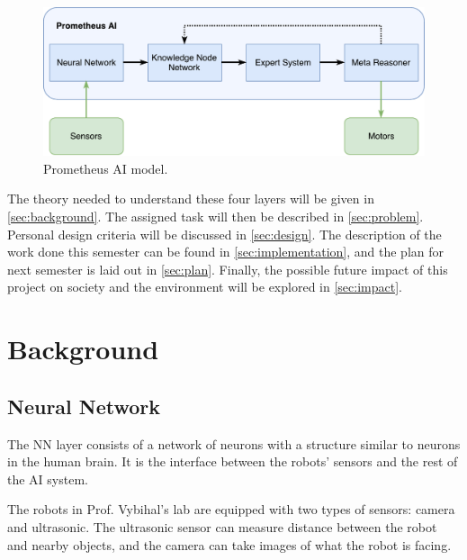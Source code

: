 \documentclass[titlepage,11pt]{article}
\begin{document}
\begin{figure}[!htb]
	\includegraphics[width=\columnwidth]{figures/ai_model.pdf}
	\caption{Prometheus AI model.}
	\label{model}
\end{figure}

The theory needed to understand these four layers will be given in \autoref{sec:background}. The assigned task will then be described in \autoref{sec:problem}. Personal design criteria will be discussed in \autoref{sec:design}. The description of the work done this semester can be found in \autoref{sec:implementation}, and the plan for next semester is laid out in \autoref{sec:plan}. Finally, the possible future impact of this project on society and the environment will be explored in \autoref{sec:impact}.

\section{Background}
\label{sec:background}

\subsection{Neural Network}

The NN layer consists of a network of neurons with a structure similar to neurons in the human brain. It is the interface between the robots' sensors and the rest of the AI system.

The robots in Prof. Vybihal's lab are equipped with two types of sensors: camera and ultrasonic. The ultrasonic sensor can measure distance between the robot and nearby objects, and the camera can take images of what the robot is facing.
\end{document}
